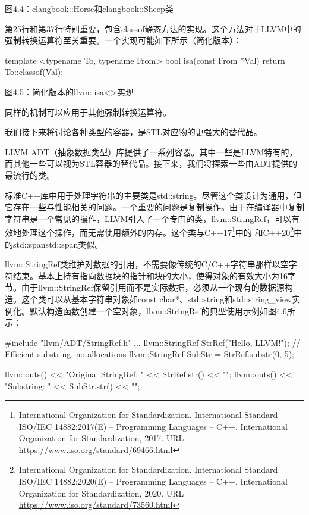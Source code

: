 \begin{center}
图4.4：clangbook::Horse和clangbook::Sheep类
\end{center}

第25行和第37行特别重要，包含classof静态方法的实现。这个方法对于LLVM中的强制转换运算符至关重要。一个实现可能如下所示（简化版本）：

\begin{cpp}
template <typename To, typename From>
bool isa(const From *Val) {
  return To::classof(Val);
}
\end{cpp}

\begin{center}
图4.5：简化版本的llvm::isa<>实现
\end{center}

同样的机制可以应用于其他强制转换运算符。

我们接下来将讨论各种类型的容器，是STL对应物的更强大的替代品。


LLVM ADT（抽象数据类型）库提供了一系列容器。其中一些是LLVM特有的，而其他一些可以视为STL容器的替代品。接下来，我们将探索一些由ADT提供的最流行的类。


标准C++库中用于处理字符串的主要类是std::string。尽管这个类设计为通用，但它存在一些与性能相关的问题。一个重要的问题是复制操作。由于在编译器中复制字符串是一个常见的操作，LLVM引入了一个专门的类，llvm::StringRef，可以有效地处理这个操作，而无需使用额外的内存。这个类与C++17\footnote{International Organization for Standardization. International Standard ISO/IEC 14882:2017(E) – Programming Languages – C++. International Organization for Standardization, 2017. URL \url{https://www.iso.org/standard/69466.html}}中的 和C++20\footnote{International Organization for Standardization. International Standard ISO/IEC 14882:2020(E) – Programming Languages – C++. International Organization for Standardization, 2020. URL \url{https://www.iso.org/standard/73560.html}}中的std::spanstd::span类似。

llvm::StringRef类维护对数据的引用，不需要像传统的C/C++字符串那样以空字符结束。基本上持有指向数据块的指针和块的大小，使得对象的有效大小为16字节。由于llvm::StringRef保留引用而不是实际数据，必须从一个现有的数据源构造。这个类可以从基本字符串对象如const char*、std::string和std::string\_view实例化。默认构造函数创建一个空对象，llvm::StringRef的典型使用示例如图4.6所示：

\begin{cpp}
#include "llvm/ADT/StringRef.h"
...
llvm::StringRef StrRef("Hello, LLVM!");
// Efficient substring, no allocations
llvm::StringRef SubStr = StrRef.substr(0, 5);

llvm::outs() << "Original StringRef: " << StrRef.str() << "\n";
llvm::outs() << "Substring: " << SubStr.str() << "\n";
\end{cpp}

